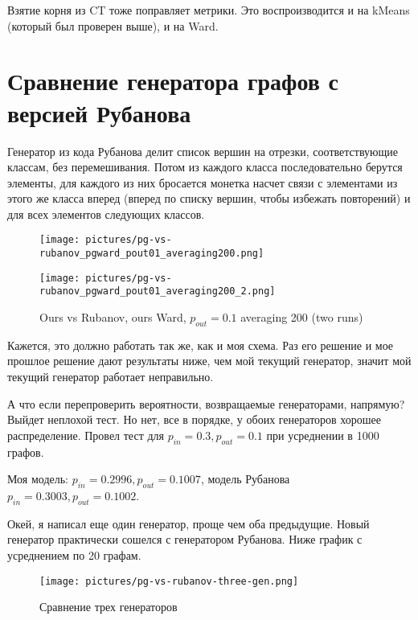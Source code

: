 \documentclass{article}
\begin{document}
Взятие корня из CT тоже поправляет метрики. Это воспроизводится и на kMeans (который был проверен выше), и на Ward.


\section{Сравнение генератора графов с версией Рубанова}

Генератор из кода Рубанова делит список вершин на отрезки, соответствующие классам, без перемешивания. Потом из каждого класса последовательно берутся элементы, для каждого из них бросается монетка насчет связи с элементами из этого же класса вперед (вперед по списку вершин, чтобы избежать повторений) и для всех элементов следующих классов.

\begin{figure}[H] %
	\begin{minipage}{.5\textwidth}
		\centerline{
			\texttt{[image: pictures/pg-vs-rubanov\_pgward\_pout01\_averaging200.png]}
		}
	\end{minipage}%
	\begin{minipage}{.5\textwidth}
		\centerline{
			\texttt{[image: pictures/pg-vs-rubanov\_pgward\_pout01\_averaging200\_2.png]}
		}
	\end{minipage}%
\caption{\label{f_Rcur}Ours vs Rubanov, ours Ward, $p_{out}=0.1$ averaging 200 (two runs)}
\end{figure}

Кажется, это должно работать так же, как и моя схема. Раз его решение и мое прошлое решение дают результаты ниже, чем мой текущий генератор, значит мой текущий генератор работает неправильно.

А что если перепроверить вероятности, возвращаемые генераторами, напрямую? Выйдет неплохой тест.
Но нет, все в порядке, у обоих генераторов хорошее распределение. Провел тест для $p_{in} = 0.3, p_{out} = 0.1$ при усреднении в 1000 графов.

Моя модель: $p_{in} = 0.2996, p_{out} = 0.1007$, модель Рубанова $p_{in} = 0.3003, p_{out} = 0.1002$.

Окей, я написал еще один генератор, проще чем оба предыдущие. Новый генератор практически сошелся с генератором Рубанова. Ниже график с усреднением по 20 графам.

\begin{figure}[H]
	\texttt{[image: pictures/pg-vs-rubanov-three-gen.png]}
	\caption{\label{f_vs2} Сравнение трех генераторов}
\end{figure}
\end{document}
